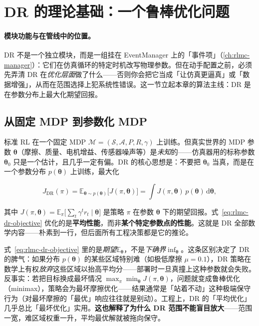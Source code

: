 \section{DR 的理论基础：一个鲁棒优化问题}
\label{sec:rlmc-dr-theory}

\paragraph{模块功能与在管线中的位置。}DR 不是一个独立模块，而是一组挂在 EventManager 上的「事件项」（\cref{ch:rlmc-manager}）：它们在仿真循环的特定时机改写物理参数。但在动手配置之前，必须先弄清 DR 在\emph{优化层面}做了什么——否则你会把它当成「让仿真更逼真」或「数据增强」，从而在范围选择上犯系统性错误。这一节立起本章的算法主线：DR 是在参数分布上最大化期望回报。

\subsection{从固定 MDP 到参数化 MDP}
\label{sec:rlmc-dr-pmdp}

标准 RL 在一个固定 MDP $\mathcal{M}=(\mathcal S,\mathcal A,P,R,\gamma)$ 上训练。但真实世界的 MDP 参数 $\boldsymbol\theta$（摩擦、质量、电机增益、传感器噪声等）是\emph{未知}的——仿真器用的标称参数 $\boldsymbol\theta_0$ 只是一个估计，且几乎一定有偏。DR 的核心思想是：不要把 $\boldsymbol\theta_0$ 当真，而是在一个参数分布 $p(\boldsymbol\theta)$ 上训练，最大化

\begin{equation}
J_{\mathrm{DR}}(\pi)=\mathbb{E}_{\boldsymbol\theta\sim p(\boldsymbol\theta)}\big[J(\pi,\boldsymbol\theta)\big]
=\int J(\pi,\boldsymbol\theta)\,p(\boldsymbol\theta)\,\mathrm d\boldsymbol\theta,
\label{eq:rlmc-dr-objective}
\end{equation}

其中 $J(\pi,\boldsymbol\theta)=\mathbb{E}_{\pi}\!\big[\sum_{t}\gamma^{t}r_{t}\mid\boldsymbol\theta\big]$ 是策略 $\pi$ 在参数 $\boldsymbol\theta$ 下的期望回报。式~\eqref{eq:rlmc-dr-objective} 优化的是\textbf{平均性能}，而非\textbf{某个特定参数点的性能}。这就是 DR 全部数学内容——朴素到一行，但后面所有工程决策都是它的推论。

\begin{insight}\label{ins:rlmc-dr-expectation}
式~\eqref{eq:rlmc-dr-objective} 里的是\emph{期望}$\mathbb{E}_{\boldsymbol\theta}$，不是\emph{下确界}$\inf_{\boldsymbol\theta}$。这条区别决定了 DR 的脾气：如果分布 $p(\boldsymbol\theta)$ 的某些区域特别难（如极低摩擦 $\mu=0.1$），DR 策略在数学上有权\emph{放弃}这些区域以抬高平均分——部署时一旦真撞上这种参数就会失败。反事实：若把目标换成最坏情况 $\max_{\pi}\min_{\boldsymbol\theta}J(\pi,\boldsymbol\theta)$，问题就变成鲁棒优化（minimax），策略会为最坏摩擦优化——结果通常是「站着不动」这种极端保守行为（对最坏摩擦的「最优」响应往往就是别动）。工程上，DR 的「平均优化」几乎总比「最坏优化」实用。\textbf{这也解释了为什么 DR 范围不能盲目放大}——范围一宽，难区域权重一升，平均最优解就被拖向保守。
\end{insight}

